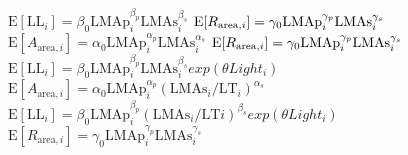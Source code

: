 \documentclass[
  12pt,
]{article}
\providecommand{\DIFdeltex}[1]{{\protect\color{red}\sout{#1}}}                      %
\providecommand{\DIFdel}[1]{\texorpdfstring{\DIFdeltex{#1}}{}} %
\begin{document}
\DIFdel{\hspace{1em}$\mathrm{E}[\mathrm{LL}_i] = \beta_0\mathrm{LMAp}_{i}^{\beta_p} \mathrm{LMAs}_{i}^{\beta_s}$}%
\DIFdel{\hspace{1em}$\mathrm{E}[R_{\mathrm{area} , i}] = \gamma_0\mathrm{LMAp}_{i}^{\gamma_p} \vphantom{2} \mathrm{LMAs}_{i}^{\gamma_s}$}%
\DIFdel{\hspace{1em}$\mathrm{E}[A_{\mathrm{area} , i}]= \alpha_0\mathrm{LMAp}_{i}^{\alpha_p} \mathrm{LMAs}_{i}^{\alpha_s}$}%
\DIFdel{\hspace{1em}$\mathrm{E}[R_{\mathrm{area} , i}] = \gamma_0\mathrm{LMAp}_{i}^{\gamma_p} \vphantom{1} \mathrm{LMAs}_{i}^{\gamma_s}$}%
\DIFdel{\hspace{1em}$\mathrm{E}[\mathrm{LL}_i] = \beta_0\mathrm{LMAp}_{i}^{\beta_p} \mathrm{LMAs}_{i}^{\beta_s}exp(\theta Light_i)$}%
\DIFdel{\hspace{1em}$\mathrm{E}[A_{\mathrm{area} , i}]= \alpha_0\mathrm{LMAp}_{i}^{\alpha_p} (\mathrm{LMAs}_{i}/\mathrm{LT}_{i})^{\alpha_s}$}%
\DIFdel{\hspace{1em}$\mathrm{E}[\mathrm{LL}_i] = \beta_0\mathrm{LMAp}_{i}^{\beta_p} (\mathrm{LMAs}_{i}/\mathrm{LT}{i})^{\beta_s}exp(\theta Light_i)$}%
\DIFdel{\hspace{1em}$\mathrm{E}[R_{\mathrm{area} , i}] = \gamma_0\mathrm{LMAp}_{i}^{\gamma_p} \mathrm{LMAs}_{i}^{\gamma_s}$}%

\end{document}
